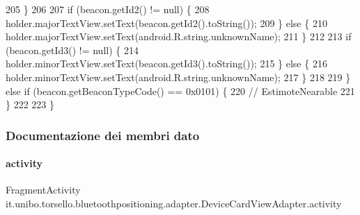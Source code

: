 \begin{DoxyCode}
205             \}
206 
207             \textcolor{keywordflow}{if} (beacon.getId2() != null) \{
208                 holder.majorTextView.setText(beacon.getId2().toString());
209             \} \textcolor{keywordflow}{else} \{
210                 holder.majorTextView.setText(android.R.string.unknownName);
211             \}
212 
213             \textcolor{keywordflow}{if} (beacon.getId3() != null) \{
214                 holder.minorTextView.setText(beacon.getId3().toString());
215             \} \textcolor{keywordflow}{else} \{
216                 holder.minorTextView.setText(android.R.string.unknownName);
217             \}
218 
219         \} \textcolor{keywordflow}{else} \textcolor{keywordflow}{if} (beacon.getBeaconTypeCode() == 0x0101) \{
220             \textcolor{comment}{// EstimoteNearable}
221         \}
222 
223     \}
\end{DoxyCode}


\subsubsection{Documentazione dei membri dato}
\hypertarget{classit_1_1unibo_1_1torsello_1_1bluetoothpositioning_1_1adapter_1_1DeviceCardViewAdapter_ad9b0572ad094da8225f1c2024ac2eb61_ad9b0572ad094da8225f1c2024ac2eb61}{}\label{classit_1_1unibo_1_1torsello_1_1bluetoothpositioning_1_1adapter_1_1DeviceCardViewAdapter_ad9b0572ad094da8225f1c2024ac2eb61_ad9b0572ad094da8225f1c2024ac2eb61} 
\paragraph{\texorpdfstring{activity}{activity}}
{\footnotesize\ttfamily Fragment\+Activity it.\+unibo.\+torsello.\+bluetoothpositioning.\+adapter.\+Device\+Card\+View\+Adapter.\+activity\hspace{0.3cm}{\ttfamily [private]}}

\hypertarget{classit_1_1unibo_1_1torsello_1_1bluetoothpositioning_1_1adapter_1_1DeviceCardViewAdapter_a0d362081de4afb44abc82197aa597a18_a0d362081de4afb44abc82197aa597a18}{}\label{classit_1_1unibo_1_1torsello_1_1bluetoothpositioning_1_1adapter_1_1DeviceCardViewAdapter_a0d362081de4afb44abc82197aa597a18_a0d362081de4afb44abc82197aa597a18} 
